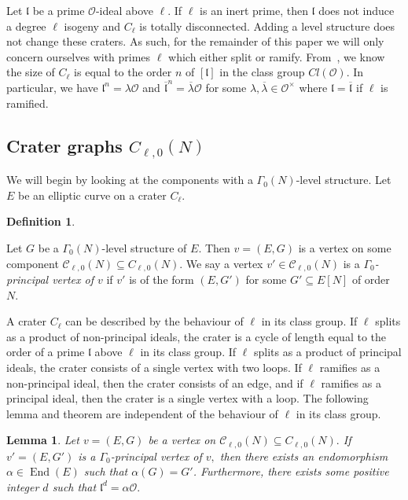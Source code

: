 \documentclass[11pt,a4paper]{amsart}
\theoremstyle{plain}
\newtheorem{lem}[thm]{Lemma}
\theoremstyle{definition}
\newtheorem{defn}[thm]{Definition}
\theoremstyle{remark}
\DeclareMathOperator{\Endo}{End}
\begin{document}
Let $\mathfrak{l}$ be a prime $\mathcal{O}$-ideal above $\ell.$ If $\ell$ is an inert prime, then $\mathfrak{l}$ does not induce a degree $\ell$ isogeny and $C_{\ell}$ is totally disconnected. Adding a level structure does not change these craters. As such, for the remainder of this paper we will only concern ourselves with primes $\ell$ which either split or ramify. From~\cite{Kohel}, we know the size of $C_{\ell}$ is equal to the order $n$ of $[\mathfrak{l}]$ in the class group $Cl(\mathcal{O}).$ In particular, we have $\mathfrak{l}^n = \lambda\mathcal{O}$ and $\overline{\mathfrak{l}}^n = \overline{\lambda}\mathcal{O}$ for some $\lambda, \overline{\lambda} \in \mathcal{O}^{\times}$ where $\mathfrak{l} = \overline{\mathfrak{l}}$ if $\ell$ is ramified.
\subsection{Crater graphs $C_{\ell,0}(N)$} We will begin by looking at the components with a $\Gamma_0(N)$-level structure. Let $E$ be an elliptic curve on a crater $C_{\ell}.$
\begin{defn}\label{defn:principal-vertex-0}

  Let $G$ be a $\Gamma_0(N)$-level structure of $E.$ Then $v = (E,G)$ is a vertex on some component $\mathcal{C}_{\ell,0}(N) \subseteq C_{\ell,0}(N).$ We say a vertex $v' \in \mathcal{C}_{\ell,0}(N)$ is a \emph{$\Gamma_0$-principal vertex of $v$} if $v'$ is of the form $(E, G')$ for some $G' \subseteq E[N]$ of order $N.$
\end{defn}
A crater $C_{\ell}$ can be described by the behaviour of $\ell$ in its class group. If $\ell$ splits as a product of non-principal ideals, the crater is a cycle of length equal to the order of a prime $\mathfrak{l}$ above $\ell$ in its class group. If $\ell$ splits as a product of principal ideals, the crater consists of a single vertex with two loops. If $\ell$ ramifies as a non-principal ideal, then the crater consists of an edge, and if $\ell$ ramifies as a principal ideal, then the crater is a single vertex with a loop. The following lemma and theorem are independent of the behaviour of $\ell$ in its class group.
\begin{lem}\label{lem:principal-vertex-0}
Let $v = (E,G)$ be a vertex on $\mathcal{C}_{\ell,0}(N) \subseteq C_{\ell,0}(N).$ If $v' = (E, G')$ is a $\Gamma_0$-principal vertex of $v,$ then there exists an endomorphism $\alpha \in \Endo(E)$ such that $\alpha(G) = G'$. Furthermore, there exists some positive integer $d$ such that $\mathfrak{l}^d = \alpha\mathcal{O}.$
\end{lem}
\end{document}
